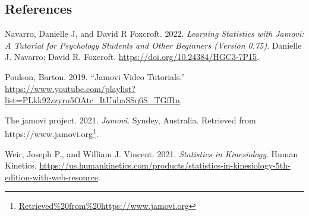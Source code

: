 \documentclass[
  letterpaper,
  DIV=11,
  numbers=noendperiod]{scrartcl}
\newlength{\cslhangindent}
\newlength{\cslentryspacingunit} %
\newenvironment{CSLReferences}[2] %
 {%
  \setlength{\parindent}{0pt}
  \ifodd #1
  \let\oldpar\par
  \def\par{\hangindent=\cslhangindent\oldpar}
  \fi
  \setlength{\parskip}{#2\cslentryspacingunit}
 }%
 {}
\DeclareRobustCommand{\href}[2]{#2\footnote{\url{#1}}}
\begin{document}
\hypertarget{references}{%
\subsection*{References}\label{references}}

\hypertarget{refs}{}
\begin{CSLReferences}{1}{0}
\leavevmode{}%
Navarro, Danielle J, and David R Foxcroft. 2022. \emph{Learning
Statistics with Jamovi: A Tutorial for Psychology Students and Other
Beginners (Version 0.75)}. Danielle J. Navarro; David R. Foxcroft.
\url{https://doi.org/10.24384/HGC3-7P15}.

\leavevmode{}%
Poulson, Barton. 2019. {``Jamovi Video Tutorials.''}
\url{https://www.youtube.com/playlist?list=PLkk92zzyru5OAtc_ItUubaSSq6S_TGfRn}.

\leavevmode{}%
The jamovi project. 2021. \emph{Jamovi}. Syndey, Australia.
\href{Retrieved\%20from\%20https://www.jamovi.org}{Retrieved from
https://www.jamovi.org}.

\leavevmode{}%
Weir, Joseph P., and William J. Vincent. 2021. \emph{Statistics in
Kinesiology}. Human Kinetics.
\url{https://us.humankinetics.com/products/statistics-in-kinesiology-5th-edition-with-web-resource}.

\end{CSLReferences}
\end{document}
